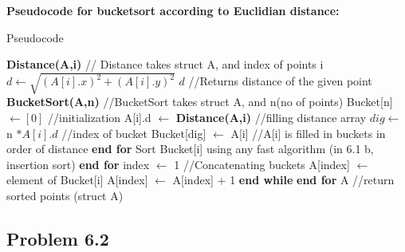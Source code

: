 \documentclass[a4paper,12pt]{article}
\begin{document}
{{\newline
\textbf{Pseudocode for bucketsort according to Euclidian distance: } \newpage
\begin{algorithm}
\caption{Pseudocode} \label{euclid}
\begin{algorithmic} [1]
\State \textbf {Distance(A,i)} // Distance takes struct A, and index of points i
\State $ d \gets \sqrt{(A[i].x) ^ 2 + (A[i].y) ^2} $
\State \Return $ d $ //Returns distance of the given point
\newline
\State \textbf{BucketSort(A,n)} //BucketSort takes struct A, and n(no of points)
\State Bucket[n] $ \gets [0] $ //initialization
\State A[i].d $ \gets $ \textbf{Distance(A,i)} //filling distance array
\State $ dig \gets $ n $ * A[i].d $ //index of bucket
\State Bucket[dig] $ \gets $ A[i] //A[i] is filled in buckets in order of distance
\EndFor
\State \textbf{end for}
\State Sort Bucket[i] using any fast algorithm (in 6.1 b, insertion sort)
\EndFor
\State \textbf{end for}
\State index $\gets$ 1
 //Concatenating buckets
\State A[index] $\gets$ element of Bucket[i]
\State A[index] $\gets$ A[index] + 1
\EndWhile 
\State \textbf{end while}
\EndFor
\State \textbf{end for}
\State \Return A //return sorted points (struct A)
\end{algorithmic}
\end{algorithm} }}
\subsection*{\newline \newline  Problem 6.2 \newline}
\end{document}
